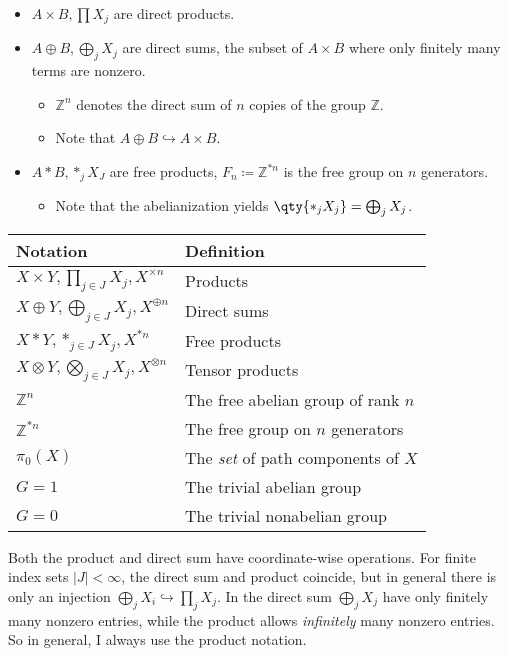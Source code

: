 \begin{itemize}
\item
  \(A\times B, \prod X_j\) are direct products.
\item
  \(A\oplus B, \bigoplus_j X_j\) are direct sums, the subset of
  \(A\times B\) where only finitely many terms are nonzero.

  \begin{itemize}
  \tightlist
  \item
    \({{\mathbb{Z}}}^n\) denotes the direct sum of \(n\) copies of the
    group \({{\mathbb{Z}}}\).
  \item
    Note that \(A \oplus B \hookrightarrow A\times B\).
  \end{itemize}
\item
  \(A\ast B, \ast_j X_J\) are free products,
  \(F_n \coloneqq{\mathbb{Z}}^{\ast n}\) is the free group on \(n\)
  generators.

  \begin{itemize}
  \tightlist
  \item
    Note that the abelianization yields
    \(\qty{\ast_j X_j} = \bigoplus_j X_j\).
  \end{itemize}
\end{itemize}

\begin{longtable}[]{@{}ll@{}}
\toprule
Notation & Definition\tabularnewline
\midrule
\endhead
\(X\times Y, \prod_{j\in J} X_j, X^{\times n}\) &
Products\tabularnewline
\(X\oplus Y, \bigoplus_{j\in J} X_j, X^{\oplus n}\) & Direct
sums\tabularnewline
\(X\ast Y, \ast_{j\in J} X_j, X^{\ast n}\) & Free
products\tabularnewline
\(X\otimes Y, \bigotimes_{j\in J} X_j, X^{\otimes n}\) & Tensor
products\tabularnewline
\({\mathbb{Z}}^n\) & The free abelian group of rank \(n\)\tabularnewline
\({\mathbb{Z}}^{\ast n}\) & The free group on \(n\)
generators\tabularnewline
\(\pi_0(X)\) & The \emph{set} of path components of \(X\)\tabularnewline
\(G=1\) & The trivial abelian group\tabularnewline
\(G=0\) & The trivial nonabelian group\tabularnewline
\bottomrule
\end{longtable}

\begin{remark}

Both the product and direct sum have coordinate-wise operations. For
finite index sets \({\left\lvert {J} \right\rvert}< \infty\), the direct
sum and product coincide, but in general there is only an injection
\(\bigoplus_j X_i \hookrightarrow\prod_j X_j\). In the direct sum
\(\bigoplus_j X_j\) have only finitely many nonzero entries, while the
product allows \emph{infinitely} many nonzero entries. So in general, I
always use the product notation.

\end{remark}

